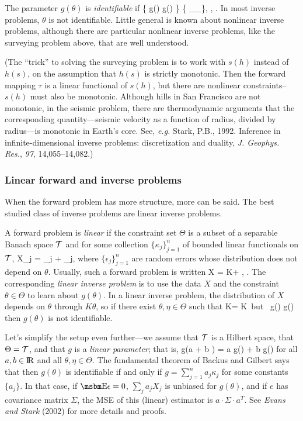 The parameter $g(\theta)$ is {\em identifiable\/} if
\beq
    \{ g(\theta) \ne g(\eta) \} \Leftarrow \{ \Pr_\theta \ne \Pr_\eta\},\;\;
    \forall \theta, \eta \in \Theta.
\eeq
In most inverse problems, $\theta$ is not identifiable.
Little general is known about nonlinear inverse problems,
although there are particular nonlinear inverse problems, like the
surveying problem above, that are well understood.

(The ``trick'' to solving the surveying problem is to work with
$s(h)$ instead of $h(s)$, on the assumption that $h(s)$ is strictly
monotonic.
Then the forward mapping $\tau$ is a linear functional of $s(h)$,
but there are nonlinear constraints--$s(h)$ must also be monotonic.
Although hills in San Francisco are not monotonic, in the seismic
problem, there are thermodynamic arguments that the corresponding
quantity---seismic velocity as a function of radius, divided by radius---is
monotonic in Earth's core.
See, {\em e.g.\/}
Stark, P.B., 1992.  Inference in infinite-dimensional inverse problems:
discretization and duality, {\em J. Geophys. Res.\/}, {\em 97\/},
14,055--14,082.)

\subsubsection{Linear forward and inverse problems}
When the forward problem has more structure, more can be said.
The best studied class of inverse problems are linear inverse problems.

A forward problem is {\em linear\/} if the constraint set $\Theta$ is
a subset of a separable Banach space ${\cal T}$ and for some collection $\{\kappa_j\}_{j=1}^n$
of bounded linear functionals on ${\cal T}$,
\beq
    X_j = \kappa_j \theta + \epsilon_j,
\eeq
where $\{\epsilon_j\}_{j=1}^n$ are random errors whose distribution does not depend on
$\theta$.
Usually, such a forward problem is written
\beq
    X = K\theta + \epsilon, \;\; \theta \in \Theta.
\eeq
The corresponding {\em linear inverse problem\/} is to use the data $X$ and the constraint
$\theta \in \Theta$ to learn about $g(\theta)$.
In a linear inverse problem, the distribution of $X$ depends on $\theta$ through
$K\theta$, so if there exist $\theta, \eta \in \Theta$ such that
\beq
    K\theta = K\eta \;\mbox{ but }\; g(\theta) \ne g(\eta)
\eeq
then $g(\theta)$ is not identifiable.

Let's simplify the setup even further---we assume that ${\cal T}$ is a Hilbert space,
that $\Theta = {\cal T}$, and that $g$ is a {\em linear parameter\/}; that is,
\beq
    g(a \theta + b \eta) = a g(\theta) + b g(\eta)
\eeq
for all $a, b \in \hbox{I\kern-.17em\hbox{R}}$ and all $\theta, \eta \in \Theta$.
The fundamental theorem of Backus and Gilbert says that then
$g(\theta)$ is identifiable if and only if $g = \sum_{j=1}^n a_j \kappa_j$
for some constants $\{a_j\}$.
In that case, if $\EE \epsilon = 0$,
$\sum_j a_j X_j$ is unbiased for $g(\theta)$, and if $e$ has covariance
matrix $\Sigma$, the MSE of this (linear) estimator is $a\cdot \Sigma \cdot a^T$.
See {\em Evans and Stark\/} (2002) for more details and proofs.

